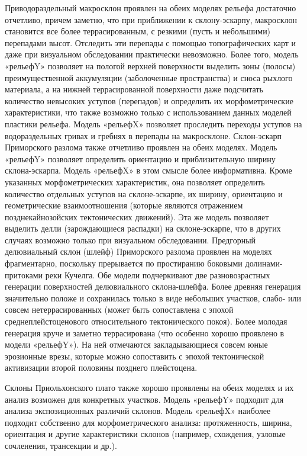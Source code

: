 \documentclass[runningheads]{AIIT}
\begin{document}
Приводораздельный макросклон проявлен на обеих моделях рельефа достаточно отчетливо, причем заметно, что при приближении к склону-эскарпу, макросклон становится все более террасированным, с резкими (пусть и небольшими) перепадами высот. Отследить эти перепады с помощью топографических карт и даже при визуальном обследовании практически невозможно. Более того, модель «рельефY» позволяет на пологой верхней поверхности выделить зоны (полосы) преимущественной аккумуляции (заболоченные пространства) и сноса рыхлого материала, а на нижней террасированной поверхности даже подсчитать количество невысоких уступов (перепадов) и определить их морфометрические характеристики, что также возможно только с использованием данных моделей пластики рельефа. Модель «рельефX» позволяет проследить переходы уступов на водораздельных гривах и гребнях в перепады на макросклоне.
Склон-эскарп Приморского разлома также отчетливо проявлен на обеих моделях. Модель «рельефY» позволяет определить ориентацию и приблизительную ширину склона-эскарпа. Модель «рельефX» в этом смысле более информативна. Кроме указанных морфометрических характеристик, она позволяет определить количество отдельных уступов на склоне-эскарпе, их ширину, ориентацию и геометрические взаимоотношения (которые являются отражением позднекайнозойских тектонических движений). Эта же модель позволяет выделить делли (зарождающиеся распадки) на склоне-эскарпе, что в других случаях возможно только при визуальном обследовании.
Предгорный делювиальный склон (шлейф) Приморского разлома проявлен на моделях фрагментарно, поскольку прерывается по простиранию боковыми долинами-притоками реки Кучелга. Обе модели подчеркивают две разновозрастных генерации поверхностей делювиального склона-шлейфа. Более древняя генерация значительно положе и сохранилась только в виде небольших участков, слабо- или совсем нетеррасированных (может быть сопоставлена с эпохой среднеплейстоценового относительного тектонического покоя). Более молодая генерация круче и заметно террасирована (что особенно хорошо проявлено в модели «рельефY»). На ней отмечаются закладывающиеся совсем юные эрозионные врезы, которые можно сопоставить с эпохой тектонической активизации второй половины позднего плейстоцена.

Склоны Приольхонского плато также хорошо проявлены на обеих моделях и их анализ возможен для конкретных участков. Модель «рельефY» подходит для анализа экспозиционных различий склонов. Модель «рельефX» наиболее подходит собственно для морфометрического анализа: протяженность, ширина, ориентация и другие характеристики склонов (например, схождения, узловые сочленения, трансекции и др.).
\end{document}

